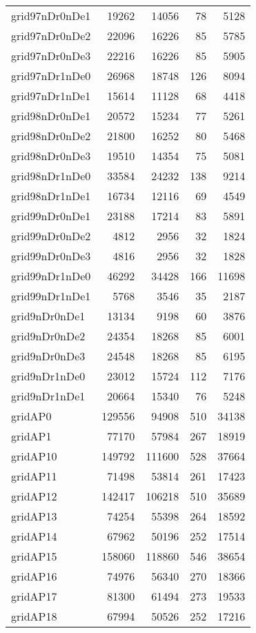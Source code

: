 \begin{tabular}{lrrrr}
grid97nDr0nDe1 & 19262 & 14056 & 78 & 5128 \\
grid97nDr0nDe2 & 22096 & 16226 & 85 & 5785 \\
grid97nDr0nDe3 & 22216 & 16226 & 85 & 5905 \\
grid97nDr1nDe0 & 26968 & 18748 & 126 & 8094 \\
grid97nDr1nDe1 & 15614 & 11128 & 68 & 4418 \\
grid98nDr0nDe1 & 20572 & 15234 & 77 & 5261 \\
grid98nDr0nDe2 & 21800 & 16252 & 80 & 5468 \\
grid98nDr0nDe3 & 19510 & 14354 & 75 & 5081 \\
grid98nDr1nDe0 & 33584 & 24232 & 138 & 9214 \\
grid98nDr1nDe1 & 16734 & 12116 & 69 & 4549 \\
grid99nDr0nDe1 & 23188 & 17214 & 83 & 5891 \\
grid99nDr0nDe2 & 4812 & 2956 & 32 & 1824 \\
grid99nDr0nDe3 & 4816 & 2956 & 32 & 1828 \\
grid99nDr1nDe0 & 46292 & 34428 & 166 & 11698 \\
grid99nDr1nDe1 & 5768 & 3546 & 35 & 2187 \\
grid9nDr0nDe1 & 13134 & 9198 & 60 & 3876 \\
grid9nDr0nDe2 & 24354 & 18268 & 85 & 6001 \\
grid9nDr0nDe3 & 24548 & 18268 & 85 & 6195 \\
grid9nDr1nDe0 & 23012 & 15724 & 112 & 7176 \\
grid9nDr1nDe1 & 20664 & 15340 & 76 & 5248 \\
gridAP0 & 129556 & 94908 & 510 & 34138 \\
gridAP1 & 77170 & 57984 & 267 & 18919 \\
gridAP10 & 149792 & 111600 & 528 & 37664 \\
gridAP11 & 71498 & 53814 & 261 & 17423 \\
gridAP12 & 142417 & 106218 & 510 & 35689 \\
gridAP13 & 74254 & 55398 & 264 & 18592 \\
gridAP14 & 67962 & 50196 & 252 & 17514 \\
gridAP15 & 158060 & 118860 & 546 & 38654 \\
gridAP16 & 74976 & 56340 & 270 & 18366 \\
gridAP17 & 81300 & 61494 & 273 & 19533 \\
gridAP18 & 67994 & 50526 & 252 & 17216 \\

\end{tabular}
